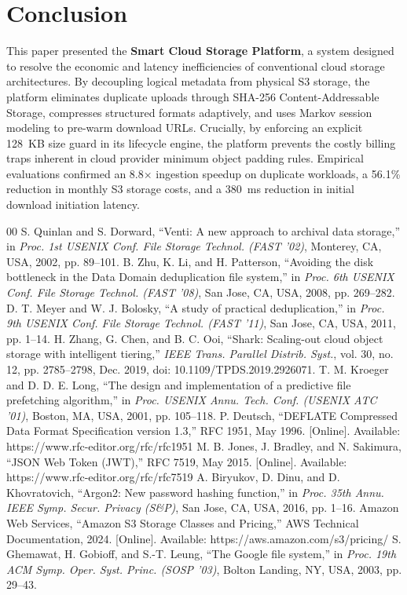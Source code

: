 \documentclass[conference]{IEEEtran}
\begin{document}
\section{Conclusion}
This paper presented the \textbf{Smart Cloud Storage Platform}, a system designed to resolve the economic and latency inefficiencies of conventional cloud storage architectures. By decoupling logical metadata from physical S3 storage, the platform eliminates duplicate uploads through SHA-256 Content-Addressable Storage, compresses structured formats adaptively, and uses Markov session modeling to pre-warm download URLs. Crucially, by enforcing an explicit 128~KB size guard in its lifecycle engine, the platform prevents the costly billing traps inherent in cloud provider minimum object padding rules. Empirical evaluations confirmed an 8.8$\times$ ingestion speedup on duplicate workloads, a 56.1\% reduction in monthly S3 storage costs, and a 380~ms reduction in initial download initiation latency.

\begin{thebibliography}{00}
 S. Quinlan and S. Dorward, ``Venti: A new approach to archival data storage,'' in \textit{Proc. 1st USENIX Conf. File Storage Technol. (FAST '02)}, Monterey, CA, USA, 2002, pp. 89--101.
 B. Zhu, K. Li, and H. Patterson, ``Avoiding the disk bottleneck in the Data Domain deduplication file system,'' in \textit{Proc. 6th USENIX Conf. File Storage Technol. (FAST '08)}, San Jose, CA, USA, 2008, pp. 269--282.
 D. T. Meyer and W. J. Bolosky, ``A study of practical deduplication,'' in \textit{Proc. 9th USENIX Conf. File Storage Technol. (FAST '11)}, San Jose, CA, USA, 2011, pp. 1--14.
 H. Zhang, G. Chen, and B. C. Ooi, ``Shark: Scaling-out cloud object storage with intelligent tiering,'' \textit{IEEE Trans. Parallel Distrib. Syst.}, vol. 30, no. 12, pp. 2785--2798, Dec. 2019, doi: 10.1109/TPDS.2019.2926071.
 T. M. Kroeger and D. D. E. Long, ``The design and implementation of a predictive file prefetching algorithm,'' in \textit{Proc. USENIX Annu. Tech. Conf. (USENIX ATC '01)}, Boston, MA, USA, 2001, pp. 105--118.
 P. Deutsch, ``DEFLATE Compressed Data Format Specification version 1.3,'' RFC 1951, May 1996. [Online]. Available: https://www.rfc-editor.org/rfc/rfc1951
 M. B. Jones, J. Bradley, and N. Sakimura, ``JSON Web Token (JWT),'' RFC 7519, May 2015. [Online]. Available: https://www.rfc-editor.org/rfc/rfc7519
 A. Biryukov, D. Dinu, and D. Khovratovich, ``Argon2: New password hashing function,'' in \textit{Proc. 35th Annu. IEEE Symp. Secur. Privacy (S\&P)}, San Jose, CA, USA, 2016, pp. 1--16.
 Amazon Web Services, ``Amazon S3 Storage Classes and Pricing,'' AWS Technical Documentation, 2024. [Online]. Available: https://aws.amazon.com/s3/pricing/
 S. Ghemawat, H. Gobioff, and S.-T. Leung, ``The Google file system,'' in \textit{Proc. 19th ACM Symp. Oper. Syst. Princ. (SOSP '03)}, Bolton Landing, NY, USA, 2003, pp. 29--43.
\end{thebibliography}
\end{document}
